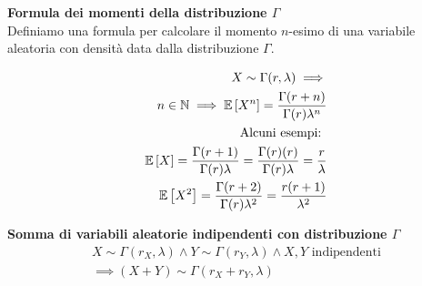 \begin{defn}
    \textbf{Formula dei momenti della distribuzione $\Gamma$} \\
    Definiamo una formula per calcolare il momento $n$-esimo di una variabile
    aleatoria con densità data dalla distribuzione $\Gamma$.

    \begin{equation*}
        \begin{aligned}
        X \sim \Gamma(r, \lambda) \implies \\
        n \in \mathbb{N} \implies \mathbb{E}\left[X^n\right] = \frac{\Gamma(r + n)}{\Gamma(r) \lambda^n} \\
        \text{Alcuni esempi: } \\
        \mathbb{E}\left[X\right] = \frac{\Gamma(r + 1)}{\Gamma(r) \lambda} = \frac{\Gamma(r) (r)}{\Gamma(r) \lambda} = \frac{r}{\lambda} \\
        \mathbb{E}\left[X^2\right] = \frac{\Gamma(r + 2)}{\Gamma(r) \lambda^2} = \frac{r(r+1)}{\lambda^2}
        \end{aligned}
    \end{equation*}


    
\end{defn}

\begin{defn}
    \textbf{Somma di variabili aleatorie indipendenti con distribuzione $\Gamma$} \\

    \begin{equation*}
        \begin{aligned}
            X \sim \Gamma(r_X, \lambda) \land Y \sim \Gamma(r_Y, \lambda) \land X,Y \text{  indipendenti} \\
            \implies (X + Y) \sim \Gamma(r_X + r_Y, \lambda)
        \end{aligned}
    \end{equation*}

\end{defn}


